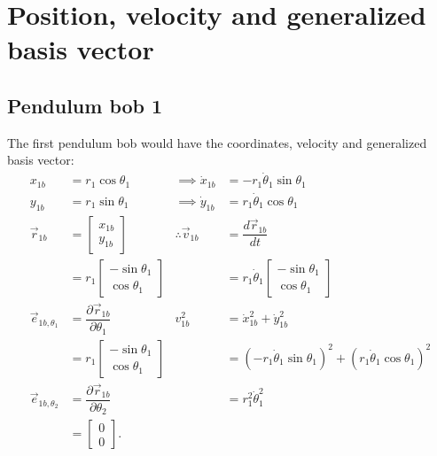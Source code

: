 \documentclass[12pt,a4paper,portrait]{article}
\begin{document}
	
	\section{Position, velocity and generalized basis vector}
	\subsection{Pendulum bob 1}
	The first pendulum bob would have the coordinates, velocity and generalized basis vector:
	\begin{align*}
		x_{1b} &= r_1 \cos{\theta_1} &\implies \dot{x}_{1b} &= -r_1\dot{\theta}_1 \sin{\theta_1}\\
		y_{1b} &= r_1 \sin{\theta_1} &\implies \dot{y}_{1b} &= r_1 \dot{\theta}_1 \cos{\theta_1} \\
		\vec{r}_{1b} &= \begin{bmatrix}
			x_{1b}\\
			y_{1b}
		\end{bmatrix}  &\therefore \vec{v}_{1b} &= \dfrac{d \vec{r}_{1b}}{dt}\\
		&= r_1\begin{bmatrix}
				-\sin{\theta_1} \\
				\cos{\theta_1}
			\end{bmatrix} & &=r_1\dot{\theta}_1 \begin{bmatrix}
			-\sin{\theta_1} \\
			\cos{\theta_1}
		\end{bmatrix} \\
		\vec{e}_{1b,\theta_1} &= \dfrac{\partial \vec{r}_{1b}}{\partial \theta_1}& v_{1b}^2 &= \dot{x}_{1b}^2 + \dot{y}_{1b}^2 \\
		&= r_1 \begin{bmatrix}
			-\sin{\theta_1}\\
			\cos{\theta_1}
		\end{bmatrix} & &= \left(-r_1\dot{\theta}_1 \sin{\theta_1}\right)^2 + \left(r_1 \dot{\theta}_1 \cos{\theta_1}\right)^2 \\
		\vec{e}_{1b,\theta_2} &= \dfrac{\partial \vec{r}_{1b}}{\partial \theta_2} &&= r_1^2 \dot{\theta}_1^2\\
		&= \begin{bmatrix}
			0\\
			0
		\end{bmatrix}.
	\end{align*}
	
\end{document}
